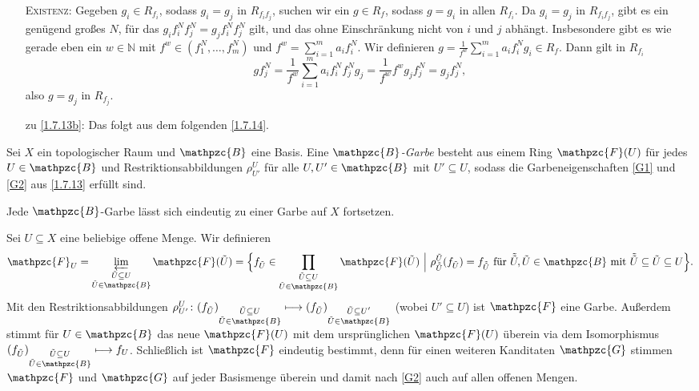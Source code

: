 \documentclass[a4paper,12pt]{scrbook}
\makeatletter
\theoremstyle{blah}
\theoremstyle{stz}
\renewcommand{\proofname}{Beweis}
\renewenvironment{proof}[1][\proofname]{\par
  \pushQED{\qed}%
  \normalfont \topsep6\p@\@plus6\p@\relax
  \trivlist
  \item[\hskip\labelsep
        \itshape
    #1\@addpunct{:}]\ignorespaces
}{%
  \popQED\endtrivlist\@endpefalse
}
\newcommand{\set}[1]{\ensuremath{\mathbb{#1}}}
\newcommand{\N}{\set{N}}
\renewcommand{\mapsto}{\longmapsto}
\makeatother
\begin{document}
\begin{proof}
\begin{enumerate}
    \textsc{Existenz}: Gegeben $g_i\in R_{f_i}$, sodass $g_i=g_j$ in $R_{f_if_j}$, suchen wir ein $g\in R_f$, sodass $g=g_i$ in
    allen $R_{f_i}$. Da $g_i=g_j$ in $R_{f_if_j}$, gibt es ein genügend großes $N$, für das $g_if_i^Nf_j^N=g_jf_i^Nf_j^N$ gilt,
    und das ohne Einschränkung nicht von $i$ und $j$ abhängt. Insbesondere gibt es wie gerade eben ein $w\in\N$ mit
    $f^w\in(f_1^N,\dotsc,f_m^N)$ und $f^w=\sum_{i=1}^ma_if_i^N$. Wir definieren $g=\frac{1}{f^w}\sum_{i=1}^ma_if_i^Ng_i\in
    R_f$. Dann gilt in $R_{f_i}$
    \[ gf_j^N=\frac{1}{f^w}\sum_{i=1}^ma_if_i^Nf_j^Ng_j=\frac{1}{f^w}f^wg_jf_j^N=g_jf_j^N, \]
    also $g=g_j$ in $R_{f_j}$.
  \item [zu] \ref{1.7.13b}: Das folgt aus dem folgenden \autoref{1.7.14}.
  \end{enumerate}
\end{proof}

\begin{lem}\label{1.7.14}
  Sei $X$ ein topologischer Raum und $\mathpzc{B}$ eine Basis. Eine \emph{$\mathpzc{B}$-Garbe} besteht aus einem Ring
  $\mathpzc{F}(U)$ für jedes $U\in\mathpzc{B}$ und Restriktionsabbildungen $\rho_{U'}^U$ für alle $U,U'\in\mathpzc{B}$ mit
  $U'\subseteq U$, sodass die Garbeneigenschaften \ref{G1} und \ref{G2} aus \autoref{1.7.13} erfüllt sind.

  Jede $\mathpzc{B}$-Garbe lässt sich eindeutig zu einer Garbe auf $X$ fortsetzen.
\end{lem}
\begin{proof}
  Sei $U\subseteq X$ eine beliebige offene Menge. Wir definieren
  \[ \mathpzc{F}_U = \varprojlim_{\substack{\tilde{U}\subseteq U\\\tilde{U}\in\mathpzc{B}}}\mathpzc{F}(\tilde{U}) =
     \Bigl\{f_{\tilde{U}}\in\prod_{\substack{\tilde{U}\subseteq U\\\tilde{U}\in\mathpzc{B}}}\mathpzc{F}(\tilde{U}) \ \Big|\ 
     \rho_{\tilde{\tilde{U}}}^{\tilde{U}}(f_{\tilde{U}})=f_{\tilde{\tilde{U}}}\text{ für }
     \tilde{\tilde{U}},\tilde{U}\in\mathpzc{B} \text{ mit } \tilde{\tilde{U}}\subseteq\tilde{U}\subseteq U \Bigr\}. \]
     Mit den Restriktionsabbildungen
     $\rho_{U'}^U\colon (f_{\tilde{U}})_{\substack{\tilde{U}\subseteq U\\\tilde{U}\in\mathpzc{B}}} \mapsto
     (f_{\tilde{U}})_{\substack{\tilde{U}\subseteq U'\\\tilde{U}\in\mathpzc{B}}}$ (wobei $U'\subseteq U$) ist $\mathpzc{F}$ eine
     Garbe. Außerdem stimmt für $U\in\mathpzc{B}$ das neue $\mathpzc{F}(U)$ mit dem ursprünglichen $\mathpzc{F}(U)$ überein via
     dem Isomorphismus $(f_{\tilde{U}})_{\substack{\tilde{U}\subseteq U\\\tilde{U}\in\mathpzc{B}}} \mapsto f_U$.
     Schließlich ist $\mathpzc{F}$ eindeutig bestimmt, denn für einen weiteren Kanditaten $\mathpzc{G}$ stimmen $\mathpzc{F}$
     und $\mathpzc{G}$ auf jeder Basismenge überein und damit nach \ref{G2} auch auf allen offenen Mengen.
\end{proof}
\end{document}
